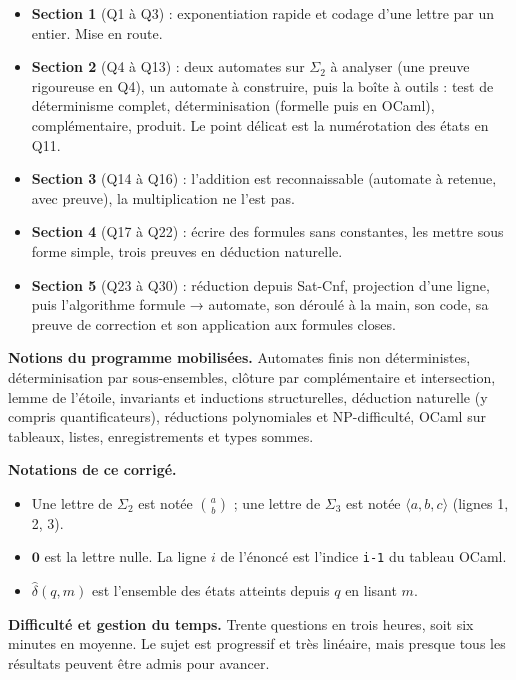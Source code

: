 \documentclass[11pt,a4paper]{article}
\providecommand{\tightlist}{\setlength{\itemsep}{0pt}\setlength{\parskip}{0pt}}
\begin{document}
\begin{itemize}
\tightlist
\item
  \textbf{Section 1} (Q1 à Q3) : exponentiation rapide et codage d'une lettre par un entier. Mise en route.
\item
  \textbf{Section 2} (Q4 à Q13) : deux automates sur \(\Sigma_2\) à analyser (une preuve rigoureuse en Q4), un automate à construire, puis la boîte à outils : test de déterminisme complet, déterminisation (formelle puis en OCaml), complémentaire, produit. Le point délicat est la numérotation des états en Q11.
\item
  \textbf{Section 3} (Q14 à Q16) : l'addition est reconnaissable (automate à retenue, avec preuve), la multiplication ne l'est pas.
\item
  \textbf{Section 4} (Q17 à Q22) : écrire des formules sans constantes, les mettre sous forme simple, trois preuves en déduction naturelle.
\item
  \textbf{Section 5} (Q23 à Q30) : réduction depuis Sat-Cnf, projection d'une ligne, puis l'algorithme formule → automate, son déroulé à la main, son code, sa preuve de correction et son application aux formules closes.
\end{itemize}

\textbf{Notions du programme mobilisées.} Automates finis non déterministes, déterminisation par sous-ensembles, clôture par complémentaire et intersection, lemme de l'étoile, invariants et inductions structurelles, déduction naturelle (y compris quantificateurs), réductions polynomiales et NP-difficulté, OCaml sur tableaux, listes, enregistrements et types sommes.

\textbf{Notations de ce corrigé.}

\begin{itemize}
\tightlist
\item
  Une lettre de \(\Sigma_2\) est notée \(\binom ab\) ; une lettre de \(\Sigma_3\) est notée \(\langle a,b,c\rangle\) (lignes 1, 2, 3).
\item
  \(\mathbf{0}\) est la lettre nulle. La ligne \(i\) de l'énoncé est l'indice \texttt{i-1} du tableau OCaml.
\item
  \(\widehat\delta(q,m)\) est l'ensemble des états atteints depuis \(q\) en lisant \(m\).
\end{itemize}

\textbf{Difficulté et gestion du temps.} Trente questions en trois heures, soit six minutes en moyenne. Le sujet est progressif et très linéaire, mais presque tous les résultats peuvent être admis pour avancer.
\end{document}
